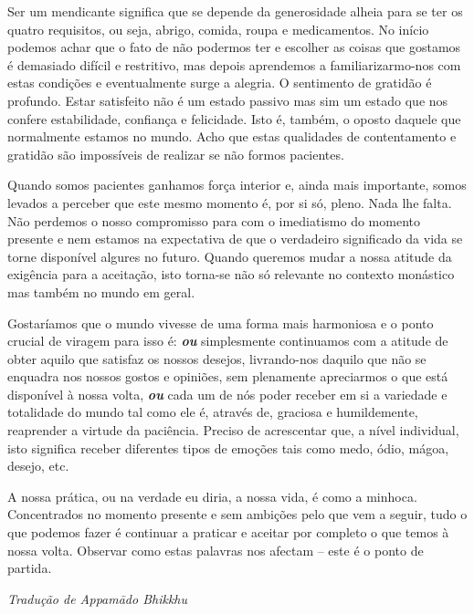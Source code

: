 Ser um mendicante significa que se depende da generosidade alheia para
se ter os quatro requisitos, ou seja, abrigo, comida, roupa e
medicamentos. No início podemos achar que o fato de não podermos ter e
escolher as coisas que gostamos é demasiado difícil e restritivo, mas
depois aprendemos a familiarizarmo-nos com estas condições e
eventualmente surge a alegria. O sentimento de gratidão é profundo.
Estar satisfeito não é um estado passivo mas sim um estado que nos
confere estabilidade, confiança e felicidade. Isto é, também, o oposto
daquele que normalmente estamos no mundo. Acho que estas qualidades de
contentamento e gratidão são impossíveis de realizar se não formos
pacientes.

Quando somos pacientes ganhamos força interior e, ainda mais importante,
somos levados a perceber que este mesmo momento é, por si só, pleno.
Nada lhe falta. Não perdemos o nosso compromisso para com o imediatismo
do momento presente e nem estamos na expectativa de que o verdadeiro
significado da vida se torne disponível algures no futuro. Quando
queremos mudar a nossa atitude da exigência para a aceitação, isto
torna-se não só relevante no contexto monástico mas também no mundo em
geral.

Gostaríamos que o mundo vivesse de uma forma mais harmoniosa e o ponto
crucial de viragem para isso é: \emph{\textbf{ou}} simplesmente
continuamos com a atitude de obter aquilo que satisfaz os nossos
desejos, livrando-nos daquilo que não se enquadra nos nossos gostos e
opiniões, sem plenamente apreciarmos o que está disponível à nossa
volta, \emph{\textbf{ou}} cada um de nós poder receber em si a variedade
e totalidade do mundo tal como ele é, através de, graciosa e
humildemente, reaprender a virtude da paciência. Preciso de acrescentar
que, a nível individual, isto significa receber diferentes tipos de
emoções tais como medo, ódio, mágoa, desejo, etc.

A nossa prática, ou na verdade eu diria, a nossa vida, é como a minhoca.
Concentrados no momento presente e sem ambições pelo que vem a seguir,
tudo o que podemos fazer é continuar a praticar e aceitar por completo o
que temos à nossa volta. Observar como estas palavras nos afectam --
este é o ponto de partida.

\bigskip

{\raggedleft\itshape
  Tradução de Appamādo Bhikkhu
\par}

